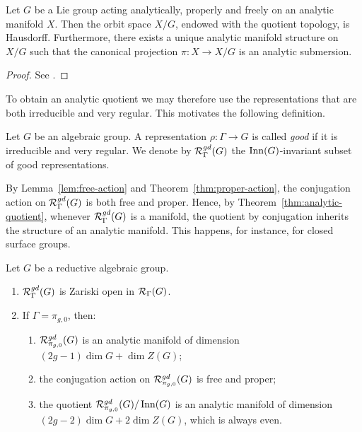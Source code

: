 \begin{theorem}\label{thm:analytic-quotient}
    Let $G$ be a Lie group acting analytically, properly and freely on an analytic manifold $X$. Then the orbit space $X/G$, endowed with the quotient topology, is Hausdorff. Furthermore, there exists a unique analytic manifold structure on $X/G$ such that the canonical projection $\pi : X \to X/G$ is an analytic submersion.
\end{theorem}

\begin{proof}
    See \cite[Chap.~III, \S 1.5, Prop.~10]{Bourbaki1975-gf}.
\end{proof}

To obtain an analytic quotient we may therefore use the representations that are both irreducible and very regular. This motivates the following definition.

\begin{definition}
    Let $G$ be an algebraic group. A representation $\rho : \Gamma \to G$ is called \emph{good} if it is irreducible and very regular. We denote by $\RepVar{\Gamma}{G}[gd]$ the $\operatorname{Inn}(G)$-invariant subset of good representations.
\end{definition}

By Lemma~\ref{lem:free-action} and Theorem~\ref{thm:proper-action}, the conjugation action on $\RepVar{\Gamma}{G}[gd]$ is both free and proper. Hence, by Theorem~\ref{thm:analytic-quotient}, whenever $\RepVar{\Gamma}{G}[gd]$ is a manifold, the quotient by conjugation inherits the structure of an analytic manifold. This happens, for instance, for closed surface groups.

\begin{proposition}\label{prop:good-surface}
    Let $G$ be a reductive algebraic group.
    \begin{enumerate}
        \item $\RepVar{\Gamma}{G}[gd]$ is Zariski open in $\RepVar{\Gamma}{G}$.
        \item If $\Gamma = \pi_{g,0}$, then:
        \begin{enumerate}
            \item $\RepVar{\pi_{g,0}}{G}[gd]$ is an analytic manifold of dimension $(2g-1)\dim G + \dim Z(G)$;
            \item the conjugation action on $\RepVar{\pi_{g,0}}{G}[gd]$ is free and proper;
            \item the quotient $\RepVar{\pi_{g,0}}{G}[gd] / \Inn(G)$ is an analytic manifold of dimension $(2g-2)\dim G + 2\dim Z(G)$, which is always even.
        \end{enumerate}
    \end{enumerate}
\end{proposition}

